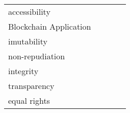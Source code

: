 \begin{tabular}{m{2.8cm}lllllll}
accessibility                               & \multicolumn{1}{c}{}                         & \multicolumn{1}{c}{}                          & \multicolumn{1}{c}{}                     & \multicolumn{1}{c}{}                      & \multicolumn{1}{c}{}                       & \multicolumn{1}{c}{}                             & \multicolumn{1}{c}{}                         \\
\multicolumn{8}{l}{\cellcolor[HTML]{C0C0C0}Blockchain Application}                                                                                                                                                                                                                                                                                                               \\
imutability                                 & \multicolumn{1}{c}{}                         & \multicolumn{1}{c}{}                          & \multicolumn{1}{c}{}                     & \multicolumn{1}{c}{}                      & \multicolumn{1}{c}{}                       & \multicolumn{1}{c}{}                             & \multicolumn{1}{c}{}                         \\
non-repudiation                             &                                              &                                               &                                          &                                           &                                            &                                                  &                                              \\
integrity                                   &                                              &                                               &                                          &                                           &                                            &                                                  &                                              \\
transparency                                &                                              &                                               &                                          &                                           &                                            &                                                  &                                              \\
equal rights                                &                                              &                                               &                                          &                                           &                                            &                                                  &                                              \\

\end{tabular}
